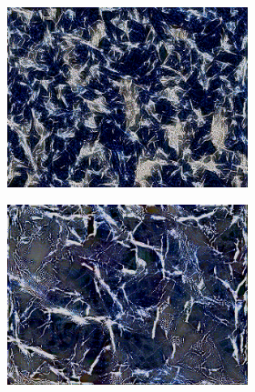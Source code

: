 \begin{figure}[]
\begin{subfigure}{\textwidth}
\begin{subfigure}{0.19\textwidth}
            \centering
            \includegraphics[width=\textwidth]{images/04-experiment02/isolating_issues/210_gatys.jpg}
            \caption*{}
        \end{subfigure}
        \hfill
        \begin{subfigure}{0.19\textwidth}
            \centering
            \includegraphics[width=\textwidth]{images/04-experiment02/isolating_issues/210_improved.jpg}
            \caption*{}
        \end{subfigure}
        \hfill
        \begin{subfigure}{0.19\textwidth}
            \centering

\end{subfigure}
\end{subfigure}
\end{figure}
